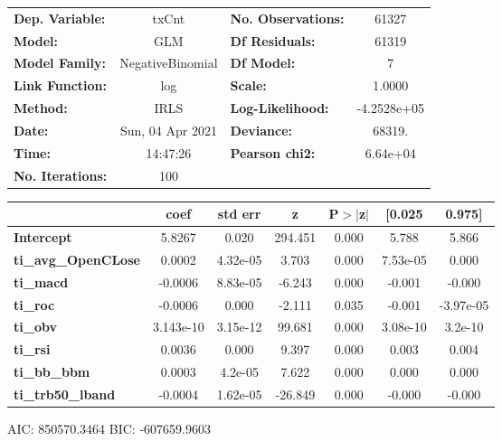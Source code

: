 \begin{center}
\begin{tabular}{lclc}
\toprule
\textbf{Dep. Variable:}     &      txCnt       & \textbf{  No. Observations:  } &     61327    \\
\textbf{Model:}             &       GLM        & \textbf{  Df Residuals:      } &     61319    \\
\textbf{Model Family:}      & NegativeBinomial & \textbf{  Df Model:          } &         7    \\
\textbf{Link Function:}     &       log        & \textbf{  Scale:             } &     1.0000   \\
\textbf{Method:}            &       IRLS       & \textbf{  Log-Likelihood:    } & -4.2528e+05  \\
\textbf{Date:}              & Sun, 04 Apr 2021 & \textbf{  Deviance:          } &     68319.   \\
\textbf{Time:}              &     14:47:26     & \textbf{  Pearson chi2:      } &   6.64e+04   \\
\textbf{No. Iterations:}    &       100        & \textbf{                     } &              \\
\bottomrule
\end{tabular}
\begin{tabular}{lcccccc}
                            & \textbf{coef} & \textbf{std err} & \textbf{z} & \textbf{P$> |$z$|$} & \textbf{[0.025} & \textbf{0.975]}  \\
\midrule
\textbf{Intercept}          &       5.8267  &        0.020     &   294.451  &         0.000        &        5.788    &        5.866     \\
\textbf{ti\_avg\_OpenCLose} &       0.0002  &     4.32e-05     &     3.703  &         0.000        &     7.53e-05    &        0.000     \\
\textbf{ti\_macd}           &      -0.0006  &     8.83e-05     &    -6.243  &         0.000        &       -0.001    &       -0.000     \\
\textbf{ti\_roc}            &      -0.0006  &        0.000     &    -2.111  &         0.035        &       -0.001    &    -3.97e-05     \\
\textbf{ti\_obv}            &    3.143e-10  &     3.15e-12     &    99.681  &         0.000        &     3.08e-10    &      3.2e-10     \\
\textbf{ti\_rsi}            &       0.0036  &        0.000     &     9.397  &         0.000        &        0.003    &        0.004     \\
\textbf{ti\_bb\_bbm}        &       0.0003  &      4.2e-05     &     7.622  &         0.000        &        0.000    &        0.000     \\
\textbf{ti\_trb50\_lband}   &      -0.0004  &     1.62e-05     &   -26.849  &         0.000        &       -0.000    &       -0.000     \\
\bottomrule
\end{tabular}
\end{center}

AIC: 850570.3464 BIC: -607659.9603

